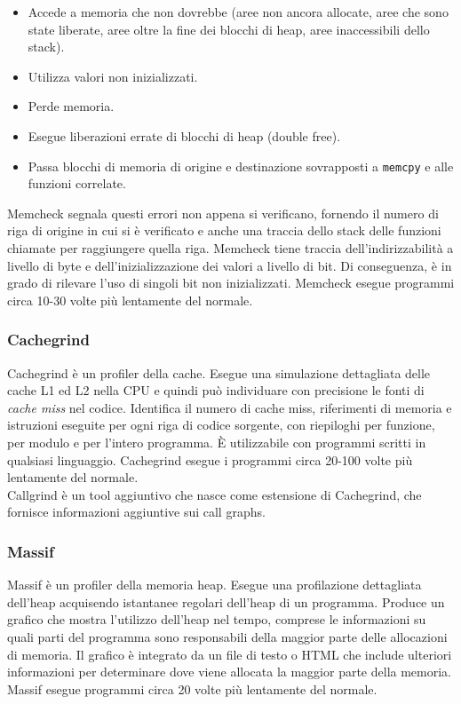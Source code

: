 \documentclass{article}
\begin{document}
\begin{itemize}
    \item Accede a memoria che non dovrebbe (aree non ancora allocate, aree che
    sono state liberate, aree oltre la fine dei blocchi di heap, aree inaccessibili dello stack).
    \item Utilizza valori non inizializzati.
    \item Perde memoria.
    \item Esegue liberazioni errate di blocchi di heap (double free).
    \item Passa blocchi di memoria di origine e destinazione sovrapposti a \texttt{memcpy}
    e alle funzioni correlate.
\end{itemize}

Memcheck segnala questi errori non appena si verificano, fornendo il numero di
riga di origine in cui si è verificato e anche una traccia dello stack delle
funzioni chiamate per raggiungere quella riga. Memcheck tiene traccia
dell'indirizzabilità a livello di byte e dell'inizializzazione dei valori a
livello di bit. Di conseguenza, è in grado di rilevare l'uso di singoli bit non
inizializzati.
Memcheck esegue programmi circa 10-30 volte più lentamente del normale.

\subsubsection{Cachegrind}

Cachegrind è un profiler della cache. Esegue una simulazione dettagliata delle
cache L1 ed L2 nella CPU e quindi può individuare con precisione le fonti di
\emph{cache miss} nel codice. Identifica il numero di cache miss, riferimenti di
memoria e istruzioni eseguite per ogni riga di codice sorgente, con riepiloghi
per funzione, per modulo e per l'intero programma. È utilizzabile con programmi scritti
in qualsiasi linguaggio. Cachegrind esegue i programmi circa 20-100 volte più
lentamente del normale. \\

Callgrind è un tool aggiuntivo che nasce come estensione di Cachegrind, che
fornisce informazioni aggiuntive sui call graphs.

\subsubsection{Massif}

Massif è un profiler della memoria heap. Esegue una profilazione dettagliata dell'heap
acquisendo istantanee regolari dell'heap di un programma. Produce un grafico che
mostra l'utilizzo dell'heap nel tempo, comprese le informazioni su quali parti
del programma sono responsabili della maggior parte delle allocazioni di
memoria. Il grafico è integrato da un file di testo o HTML che include ulteriori
informazioni per determinare dove viene allocata la maggior parte della memoria.
Massif esegue programmi circa 20 volte più lentamente del normale.
\end{document}
